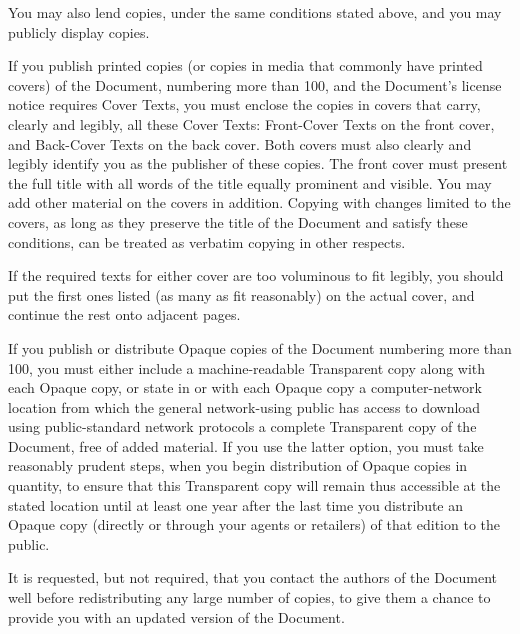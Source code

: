 You may also lend copies, under the same conditions stated above, and
you may publicly display copies.


\stopalignment


If you publish printed copies (or copies in media that commonly have
printed covers) of the Document, numbering more than 100, and the
Document's license notice requires Cover Texts, you must enclose the
copies in covers that carry, clearly and legibly, all these Cover
Texts: Front-Cover Texts on the front cover, and Back-Cover Texts on
the back cover.  Both covers must also clearly and legibly identify
you as the publisher of these copies.  The front cover must present
the full title with all words of the title equally prominent and
visible.  You may add other material on the covers in addition.
Copying with changes limited to the covers, as long as they preserve
the title of the Document and satisfy these conditions, can be treated
as verbatim copying in other respects.

If the required texts for either cover are too voluminous to fit
legibly, you should put the first ones listed (as many as fit
reasonably) on the actual cover, and continue the rest onto adjacent
pages.

If you publish or distribute Opaque copies of the Document numbering
more than 100, you must either include a machine-readable Transparent
copy along with each Opaque copy, or state in or with each Opaque copy
a computer-network location from which the general network-using
public has access to download using public-standard network protocols
a complete Transparent copy of the Document, free of added material.
If you use the latter option, you must take reasonably prudent steps,
when you begin distribution of Opaque copies in quantity, to ensure
that this Transparent copy will remain thus accessible at the stated
location until at least one year after the last time you distribute an
Opaque copy (directly or through your agents or retailers) of that
edition to the public.

It is requested, but not required, that you contact the authors of the
Document well before redistributing any large number of copies, to give
them a chance to provide you with an updated version of the Document.


\stopalignment

